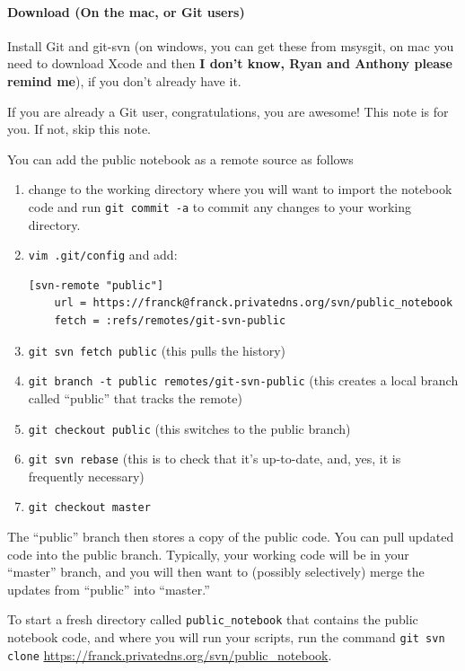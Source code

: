 \paragraph{Download (On the mac, or Git users)}
Install Git and git-svn (on windows, you can get these from msysgit, on mac you need to download Xcode and then \textbf{I don't know, Ryan and Anthony please remind me}), if you don't already have it.
\begin{inplacenotebox}
If you are already a Git user, congratulations, you are awesome!
This note is for you.
If not, skip this note.

You can add the public notebook as a remote source as follows
    \begin{enumerate}
        \item change to the working directory where you will
            want to import the notebook code and run \texttt{git commit -a} 
            to commit any changes to your working directory.
        \item \texttt{vim .git/config} 
            and add:
    \begin{tiny}
            \begin{verbatim}
[svn-remote "public"]
	url = https://franck@franck.privatedns.org/svn/public_notebook
	fetch = :refs/remotes/git-svn-public
            \end{verbatim}
    \end{tiny}
        \item \texttt{git svn fetch public} 
            (this pulls the history)

        \item \texttt{git branch -t public remotes/git-svn-public} 
            (this creates a local branch called ``public'' that tracks the remote)

        \item \texttt{git checkout public} 
            (this switches to the public branch)

        \item \texttt{git svn rebase} 
            (this is to check that it's up-to-date, and, yes, it is frequently necessary)

        \item \texttt{git checkout master} 
    \end{enumerate}
The ``public'' branch then stores a copy of the public code.
You can pull updated code into the public branch.
Typically, your working code will be in your ``master'' branch,
    and you will then want to (possibly selectively) merge the updates
    from ``public'' into ``master.''
\end{inplacenotebox}
To start a fresh directory called \texttt{public\_notebook} that contains the public notebook code, and where you will run your scripts, run the command
\texttt{git svn clone} \url{https://franck.privatedns.org/svn/public\_notebook}.

